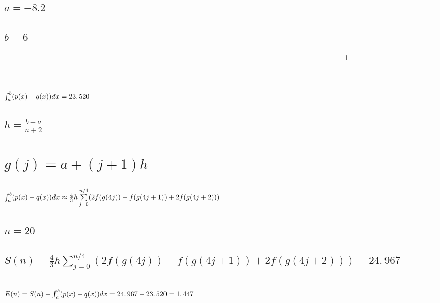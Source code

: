 \documentclass{article}
\begin{document}
\subsection{$a=-8.2$}

\subsection{$b=6$}

\bigskip 

\bigskip 

==============================================================1=============================================================

\subsection{ $\protect\int_{a}^{b}(p(x)-q(x))dx=\allowbreak 23.\,\allowbreak
520$}

\subsection{$h=\frac{b-a}{n+2}$}

\section{$g(j)=a+(j+1)h$}

\subsection{$\protect\int_{a}^{b}(p(x)-q(x))dx\approx \frac{4}{3}%
h\sum\limits_{j=0}^{n/4}(2f(g(4j))-f(g(4j+1))+2f(g(4j+2)))$}

\bigskip

\subsection{\protect\bigskip $n=20$}

\subsection{$S(n)=\frac{4}{3}h\sum%
\limits_{j=0}^{n/4}(2f(g(4j))-f(g(4j+1))+2f(g(4j+2)))=\allowbreak
24.\,\allowbreak 967$}

\subsection{$E(n)=S(n)-\protect\int_{a}^{b}(p(x)-q(x))dx\allowbreak
\allowbreak =24.\,\allowbreak 967-23.\,\allowbreak 520=\allowbreak
1.\,\allowbreak 447$}
\end{document}
